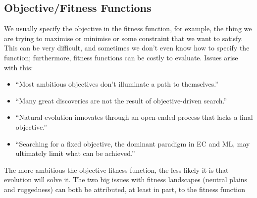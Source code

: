 \documentclass[a4paper,11pt]{article}
\begin{document}
\subsection{Objective/Fitness Functions}
We usually specify the objective in the fitness function, for example, the thing we are trying to maximise or minimise or some constraint that we want to satisfy.
This can be very difficult, and sometimes we don't even know how to specify the function;
furthermore, fitness functions can be costly to evaluate.
Issues arise with this:
\begin{itemize}
    \item   ``Most ambitious objectives don't illuminate a path to themselves.''
    \item   ``Many great discoveries are not the result of objective-driven search.''
    \item   ``Natural evolution innovates through an open-ended process that lacks a final objective.''
    \item   ``Searching for a fixed objective, the dominant paradigm in EC and ML, may ultimately limit what can be achieved.''
\end{itemize}

The more ambitious the objective fitness function, the less likely it is that evolution will solve it.
The two big issues with fitness landscapes (neutral plains and ruggedness) can both be attributed, at least in part, to the fitness function
\end{document}
